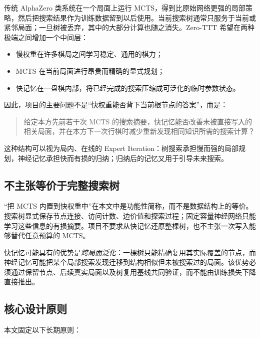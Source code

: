 \documentclass[UTF8,11pt,a4paper]{ctexart}
\newcommand{\projectname}{\textsf{Zero-TTT}}
\begin{document}
传统 AlphaZero 类系统在一个局面上运行 MCTS，得到比原始网络更强的局部策略，然后把搜索结果作为训练数据留到以后使用。当前搜索树通常只服务于当前或紧邻局面；一旦树被丢弃，其中的大部分计算也随之消失。\projectname{} 希望在两种极端之间增加一个中间层：

\begin{itemize}
  \item 慢权重在许多棋局之间学习稳定、通用的棋力；
  \item MCTS 在当前局面进行昂贵而精确的显式规划；
  \item 快记忆在一盘棋内部，将已经完成的搜索压缩成可泛化的临时参数状态。
\end{itemize}

因此，项目的主要问题不是“快权重能否背下当前根节点的答案”，而是：

\begin{quote}
给定本方先前若干次 MCTS 的搜索摘要，快记忆能否改善未被直接写入的相关局面，并在本方下一次行棋时减少重新发现相同知识所需的搜索计算？
\end{quote}

这种结构可以视为局内、在线的 Expert Iteration：树搜索承担慢而强的局部规划，神经记忆承担快而有损的归纳；归纳后的记忆又用于引导未来搜索\cite{expertiteration,alphagozero}。

\subsection{不主张等价于完整搜索树}

“把 MCTS 内置到快权重中”在本文中是功能性简称，而不是数据结构上的等价。搜索树显式保存节点连接、访问计数、边价值和探索过程；固定容量神经网络只能学习这些信息的有损摘要。项目不要求从快记忆还原整棵树，也不主张一次写入能够替代任意预算的 MCTS。

快记忆可能具有的优势是\emph{跨局面泛化}：一棵树只能精确复用其实际覆盖的节点，而神经记忆可能把某个局部搜索发现迁移到结构相似但未被搜索过的局面。该优势必须通过保留节点、后续真实局面以及树复用基线共同验证，而不能由训练损失下降直接推出。

\subsection{核心设计原则}

本文固定以下长期原则：
\end{document}
